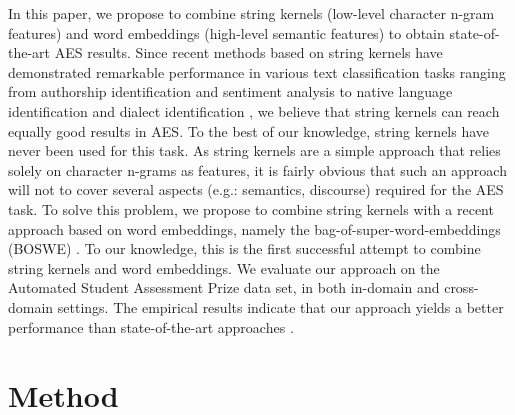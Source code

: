 \documentclass[11pt,a4paper]{article}
\begin{document}
In this paper, we propose to combine string kernels (low-level character n-gram features) and word embeddings (high-level semantic features) to obtain state-of-the-art AES results. Since recent methods based on string kernels have demonstrated remarkable performance in various text classification tasks ranging from authorship identification \cite{PopescuG12} and sentiment analysis \cite{franco-EACL-2017,marius-KES-2017} to native language identification \cite{popescu-ionescu:2013:BEA8,ionescu-popescu-cahill-EMNLP-2014,Radu-ICONIP-2015,ionescu-popescu-cahill-COLI-2016,Ionescu-BEA-2017} and dialect identification \cite{Radu-Marius-ADI-2016,Radu-Andrei-ADI-2017}, we believe that string kernels can reach equally good results in AES. To the best of our knowledge, string kernels have never been used for this task. As string kernels are a simple approach that relies solely on character n-grams as features, it is fairly obvious that such an approach will not to cover several aspects (e.g.: semantics, discourse) required for the AES task. To solve this problem, we propose to combine string kernels with a recent approach based on word embeddings, namely the bag-of-super-word-embeddings (BOSWE) \cite{Ionescu-KES-2017}. To our knowledge, this is the first successful attempt to combine string kernels and word embeddings. We evaluate our approach on the Automated Student Assessment Prize data set, in both in-domain and cross-domain settings. The empirical results indicate that our approach yields a better performance than state-of-the-art approaches \cite{Phandi-EMNLP-2015,Dong-EMNLP-2016,Dong-CONLL-2017,Tay-ACL-2018}.

\vspace*{-0.1cm} 
\section{Method}
\label{sec_String_Kernels}
\vspace*{-0.05cm} 
\end{document}
